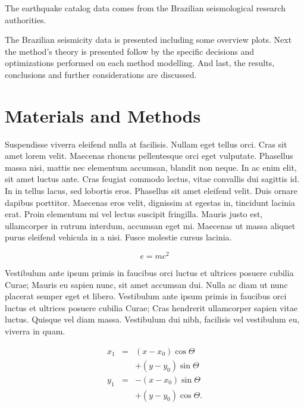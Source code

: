 \documentclass[draft,grl]{AGUTeX}
\begin{document}
\begin{article}
The earthquake catalog data comes from the Brazilian seismological research authorities.

The Brazilian seismicity data is presented including some overview plots. Next the method's theory is presented follow
by the specific decisions and optimizations performed on each method modelling. And last, the results, conclusions and
further considerations are discussed.



\section{Materials and Methods}

Suspendisse viverra eleifend nulla at facilisis. Nullam eget tellus orci. Cras sit amet lorem velit. Maecenas rhoncus pellentesque orci eget vulputate. Phasellus massa nisi, mattis nec elementum accumsan, blandit non neque. In ac enim elit, sit amet luctus ante. Cras feugiat commodo lectus, vitae convallis dui sagittis id. In in tellus lacus, sed lobortis eros. Phasellus sit amet eleifend velit. Duis ornare dapibus porttitor. Maecenas eros velit, dignissim at egestas in, tincidunt lacinia erat. Proin elementum mi vel lectus suscipit fringilla. Mauris justo est, ullamcorper in rutrum interdum, accumsan eget mi. Maecenas ut massa aliquet purus eleifend vehicula in a nisi. Fusce molestie cursus lacinia.

\begin{equation}
\label{eq:emc}
e = mc^2
\end{equation}

Vestibulum ante ipsum primis in faucibus orci luctus et ultrices posuere cubilia Curae; Mauris eu sapien nunc, sit amet accumsan dui. Nulla ac diam ut nunc placerat semper eget et libero. Vestibulum ante ipsum primis in faucibus orci luctus et ultrices posuere cubilia Curae; Cras hendrerit ullamcorper sapien vitae luctus. Quisque vel diam massa. Vestibulum dui nibh, facilisis vel vestibulum eu, viverra in quam.

\begin{eqnarray}
  x_{1} & = & (x - x_{0}) \cos \Theta \nonumber \\
        && + (y - y_{0}) \sin \Theta  \nonumber \\
  y_{1} & = & -(x - x_{0}) \sin \Theta \nonumber \\
        && + (y - y_{0}) \cos \Theta.
\end{eqnarray}


\end{article}
\end{document}

